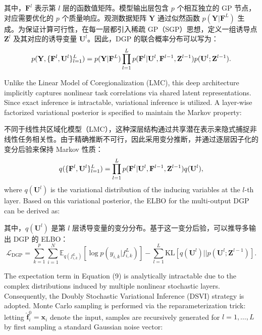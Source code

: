 \documentclass[11pt]{article}
\begin{document}
其中，$\mathbf{F}^l$ 表示第 $l$ 层的函数值矩阵。模型输出层包含 $p$ 个相互独立的 GP 节点，对应需要优化的 $p$ 个质量响应。观测数据矩阵 $\mathbf{Y}$ 通过似然函数 $p(\mathbf{Y}|\mathbf{F}^L)$ 生成。为保证计算可行性，在每一层都引入稀疏 GP（SGP）思想，定义一组诱导点 $\mathbf{Z}^l$ 及其对应的诱导变量 $\mathbf{U}^l$。因此，DGP 的联合概率分布可以写为：
\begin{equation}
	p({\bf{Y}},\{ {{\bf{F}}^l},{{\bf{U}}^l}\} _{l = 1}^L) = p({\bf{Y}}|{{\bf{F}}^L})\prod\limits_{l = 1}^L p ({{\bf{F}}^l}|{{\bf{U}}^l},{{\bf{F}}^{l - 1}},{{\bf{Z}}^{l - 1}})p({{\bf{U}}^l};{{\bf{Z}}^{l - 1}}).
\end{equation}

Unlike the Linear Model of Coregionalization (LMC), this deep architecture implicitly captures nonlinear task correlations via shared latent representations. Since exact inference is intractable, variational inference is utilized. A layer-wise factorized variational posterior is specified to maintain the Markov property:

不同于线性共区域化模型（LMC），这种深层结构通过共享潜在表示来隐式捕捉非线性任务相关性。由于精确推断不可行，因此采用变分推断，并通过逐层因子化的变分后验来保持 Markov 性质：
\begin{equation}
	q(\{ {{\bf{F}}^l},{{\bf{U}}^l}\} _{l = 1}^L) = \prod\limits_{l = 1}^L p ({{\bf{F}}^l}|{{\bf{U}}^l},{{\bf{F}}^{l - 1}},{{\bf{Z}}^{l - 1}})q({{\bf{U}}^l}){\rm{ }},
\end{equation}
where $q(\mathbf{U}^l)$ is the variational distribution of the inducing variables at the $l$-th layer. Based on this variational posterior, the ELBO for the multi-output DGP can be derived as:

其中，$q(\mathbf{U}^l)$ 是第 $l$ 层诱导变量的变分分布。基于这一变分后验，可以推导多输出 DGP 的 ELBO：
\begin{equation}
	{{\mathcal{L}}_{\text{DGP}}}=\sum\limits_{k=1}^{p}{\sum\limits_{i=1}^{N}{{{\mathbb{E}}_{q(f_{i,k}^{L})}}}}[\log p({{y}_{i,k}}|f_{i,k}^{L})]-\sum\limits_{l=1}^{L}{\text{KL}}[q({{\mathbf{U}}^{l}})||p({{\mathbf{U}}^{l}};{{\mathbf{Z}}^{l-1}})].
\end{equation}

The expectation term in Equation (9) is analytically intractable due to the complex distributions induced by multiple nonlinear stochastic layers. Consequently, the Doubly Stochastic Variational Inference (DSVI) strategy \cite{Salimbeni2017} is adopted. Monte Carlo sampling is performed via the reparameterization trick: letting $\hat{\mathbf{f}}_i^0 = \mathbf{x}_i$ denote the input, samples are recursively generated for $l=1, \dots, L$ by first sampling a standard Gaussian noise vector:
\end{document}
